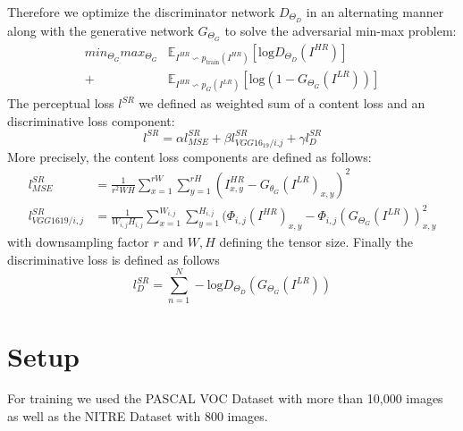 \documentclass[10pt,twocolumn,letterpaper]{article}
\begin{document}
Therefore we optimize the discriminator network $D_{\Theta_D}$ in an
alternating manner along with the generative network $G_{\Theta_G}$ to
solve the adversarial min-max problem:
\begin{align*}
  min_{\Theta_G} max_{\Theta_G} &\mathbb{E}_{I^{HR} \backsim p_{\text{train}}(I^{HR})} [\text{log} D_{\Theta_D}(I^{HR})] \\
  +&\mathbb{E}_{I^{HR} \backsim p_G(I^{LR})} [\text{log} (1-G_{\Theta_G}(I^{LR}))]
\end{align*}
The perceptual loss $l^{SR}$ we defined as weighted sum of a content loss and an discriminative loss component:
\begin{equation*}
  l^{SR}=\alpha l^{SR}_{MSE} + \beta l^{SR}_{VGG16_19/i.j} + \gamma l^{SR}_{D}
\end{equation*}
More precisely, the content loss components are defined as follows:
\begin{align*}
  l^{SR}_{M SE}       &= \frac{1}{r^2WH}\sum_{x=1}^{rW}\sum_{y=1}^{rH}(I^{HR}_{x,y}-G_{\theta_G}(I^{LR})_{x,y})^2 \\
  l^{SR}_{VGG1619/i,j}&=\frac{1}{W_{i,j}H_{i,j}} \sum_{x=1}^{W_{i,j}}\sum_{y=1}^{H_{i,j}}(\Phi_{i,j}(I^{HR})_{x,y}-\Phi_{i,j}(G_{\Theta_G}(I^{LR}))_{x,y}^2
\end{align*}
with downsampling factor $r$ and $W,H$ defining the tensor size.
Finally the discriminative loss is defined as follows
\begin{equation*}  
  l^{SR}_{D}=\sum_{n=1}^N -\text{log}D_{\Theta_D}(G_{\Theta_G}(I^{LR}))
\end{equation*}
\section{Setup}
\label{sec:setup}



For training we used the PASCAL VOC Dataset\cite{pascal-voc-2012} with
more than 10,000 images as well as the NITRE
Dataset\cite{Agustsson_2017_CVPR_Workshops} with 800 images.

\end{document}
